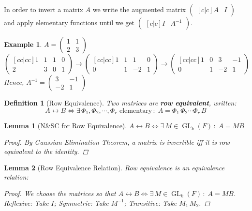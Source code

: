 \documentclass[12pt]{article}
\let\LR\Leftrightarrow
\newcommand{\Exist}[1]{\exists\,{#1}\,:\;}
\DeclareMathOperator{\GL}{GL}
\newtheorem{definition}{Definition}[subsection]
\newtheorem{lemma}{Lemma}[subsection]
\newtheorem{example}{Example}[subsection]
\begin{document}
In order to invert a matrix $A$ we write the augmented matrix $\begin{pmatrix}[c|c]A&I\end{pmatrix}$ and apply elementary functions until we get $\begin{pmatrix}[c|c]I&A^{-1}\end{pmatrix}$.

\begin{example}
  $A=\begin{pmatrix}1&1\\2&3\end{pmatrix}$
  $$
  \begin{pmatrix}[cc|cc]
    1&1&1&0\\
    2&3&0&1
  \end{pmatrix}
  \to
  \begin{pmatrix}[cc|cc]
    1&1&1&0\\
    0&1&-2&1
  \end{pmatrix}
  \to
  \begin{pmatrix}[cc|cc]
    1&0&3&-1\\
    0&1&-2&1
  \end{pmatrix}
  $$
  Hence, $A^{-1}=\begin{pmatrix}3&-1\\-2&1\end{pmatrix}$
\end{example}

\begin{definition}[Row Equivalence]
  Two matrices are \textbf{row equivalent}, written: $$A\leftrightarrow B\LR\Exist{\Phi_1,\Phi_2,\cdots,\Phi_r\text{ elementary}} A=\Phi_1\,\Phi_2\cdots \Phi_r\,B$$
\end{definition}

\begin{lemma}[N\&SC for Row Equivalence]
  $A\leftrightarrow B\LR\Exist{M\in\GL_k(F)}A=MB$
  \begin{proof}
    By Gaussian Elimination Theorem, a matrix is invertible iff it is row equivalent to the identity.
  \end{proof}
\end{lemma}

\begin{lemma}[Row Equivalence Relation]
  Row equivalence is an equivalence relation:
  \begin{proof}
    We choose the matrices so that $A\leftrightarrow B\LR\Exist{M\in\GL_k(F)}A=MB$. Reflexive: Take $I$; Symmetric: Take $M^{-1}$; Transitive: Take $M_1\,M_2$.
  \end{proof}
\end{lemma}
\end{document}
